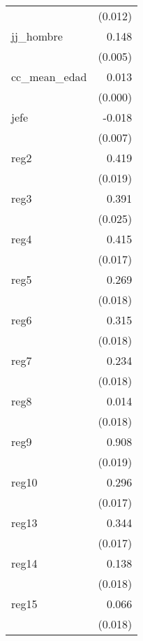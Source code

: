 {\begin{longtable}{l*{1}{D{.}{.}{-1}}}
            &     (0.012)         \\
\addlinespace
jj\_hombre   &       0.148\sym{***}\\
            &     (0.005)         \\
\addlinespace
cc\_mean\_edad&       0.013\sym{***}\\
            &     (0.000)         \\
\addlinespace
jefe        &      -0.018\sym{**} \\
            &     (0.007)         \\
\addlinespace
reg2        &       0.419\sym{***}\\
            &     (0.019)         \\
\addlinespace
reg3        &       0.391\sym{***}\\
            &     (0.025)         \\
\addlinespace
reg4        &       0.415\sym{***}\\
            &     (0.017)         \\
\addlinespace
reg5        &       0.269\sym{***}\\
            &     (0.018)         \\
\addlinespace
reg6        &       0.315\sym{***}\\
            &     (0.018)         \\
\addlinespace
reg7        &       0.234\sym{***}\\
            &     (0.018)         \\
\addlinespace
reg8        &       0.014         \\
            &     (0.018)         \\
\addlinespace
reg9        &       0.908\sym{***}\\
            &     (0.019)         \\
\addlinespace
reg10       &       0.296\sym{***}\\
            &     (0.017)         \\
\addlinespace
reg13       &       0.344\sym{***}\\
            &     (0.017)         \\
\addlinespace
reg14       &       0.138\sym{***}\\
            &     (0.018)         \\
\addlinespace
reg15       &       0.066\sym{***}\\
            &     (0.018)         \\

\end{longtable}}
